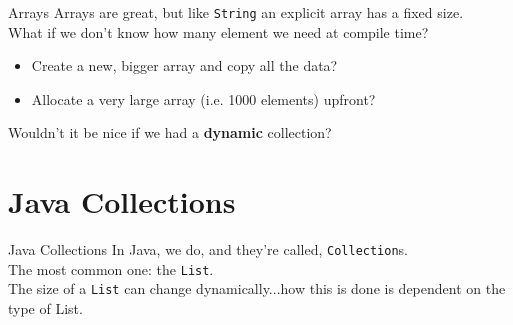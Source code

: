 \documentclass[aspectratio=169]{beamer}
\begin{document}
\begin{frame}{Arrays}
Arrays are great, but like \texttt{String} an explicit array has a fixed size. \\
\vspace{2em}
What if we don't know how many element we need at compile time? \\
\begin{itemize}
\item Create a new, bigger array and copy all the data?  \\
\item Allocate a very large array (i.e. 1000 elements) upfront? \\
\end{itemize}
\vspace{2em}
Wouldn't it be nice if we had a \textbf{dynamic} collection? \\
\end{frame}



\section*{Java Collections}



\begin{frame}{Java Collections}
In Java, we do, and they're called, \texttt{Collection}s. \\
\vspace{1em}
The most common one: the \texttt{List}.  \\
\vspace{1em}
The size of a \texttt{List} can change dynamically...how this is done is dependent on the type of List. \\
\end{frame}
\end{document}
